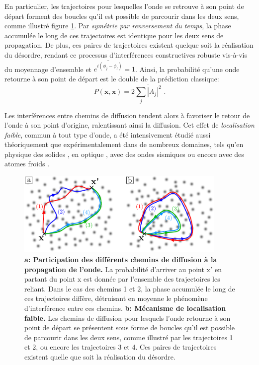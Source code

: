 En particulier, les trajectoires pour lesquelles l'onde se retrouve à son point de départ forment des boucles qu'il est possible de parcourir dans les deux sens, comme illustré figure \ref{fig:localisation_faible}. Par \emph{symétrie par renversement du temps}, la phase accumulée le long de ces trajectoires est identique pour les deux sens de propagation. De plus, ces paires de trajectoires existent quelque soit la réalisation du désordre, rendant ce processus d'interférences constructives robuste vis-à-vis du moyennage d'ensemble et $\overline{e^{i(\phi_j - \phi_l)}}=1$. Ainsi, la probabilité qu'une onde retourne à son point de départ est le double de la prédiction classique:
\begin{equation}
P(\mathbf{x},\mathbf{x})=2 \overline{\sum_j{{\left| A_j \right|}^2}} \text{ .}
\label{eq:proba_retour_origine}
\end{equation}

Les interférences entre chemins de diffusion tendent alors à favoriser le retour de l'onde à son point d'origine, ralentissant ainsi la diffusion. Cet effet de \emph{localisation faible}, commun à tout type d'onde, a été intensivement étudié aussi théoriquement que expérimentalement dans de nombreux domaines, tels qu'en physique des solides \citep{kramer1993localization}\citep{akkermans2007mesoscopic}, en optique \citep{wolf1985weak}\citep{mishchenko1993nature}, avec des ondes sismiques \citep{larose2004weak} ou encore avec des atomes froids \citep{jendrzejewski2012coherent}\citep{muller2015suppression}.


\begin{figure}
\centering
\includegraphics[width=0.9\textwidth]{Fig/Localisation/localisation_faible.pdf}
\caption{\textbf{a: Participation des différents chemins de diffusion à la propagation de l'onde.} La probabilité d'arriver au point $\mathrm{x'}$ en partant du point $\mathrm{x}$ est donnée par l'ensemble des trajectoires les reliant. Dans le cas des chemins 1 et 2, la phase accumulée le long de ces trajectoires diffère, détruisant en moyenne le phénomène d'interférence entre ces chemins. \textbf{b: Mécanisme de localisation faible.} Les chemins de diffusion pour lesquels l'onde retourne à son point de départ se présentent sous forme de boucles qu'il est possible de parcourir dans les deux sens, comme illustré par les trajectoires 1 et 2, ou encore les trajectoires 3 et 4. Ces paires de trajectoires existent quelle que soit la réalisation du désordre.}
\label{fig:localisation_faible}
\end{figure}



